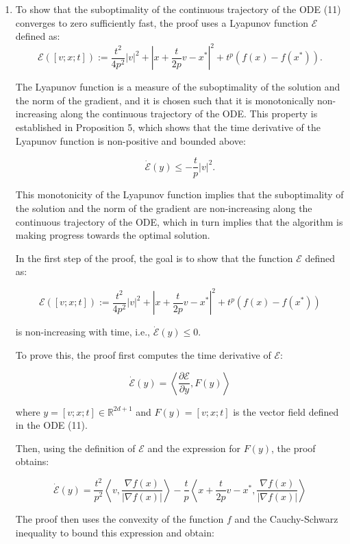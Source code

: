\begin{enumerate}

    \item To show that the suboptimality of the continuous trajectory of the ODE (11) converges to zero sufficiently fast, the proof uses a Lyapunov function $\mathcal{E}$ defined as:
    $$
    \mathcal{E}([v ; x ; t]):=\frac{t^{2}}{4 p^{2}}|v|^{2}+\left|x+\frac{t}{2 p} v-x^*{}\right|^{2}+t^{p}\left(f(x)-f\left(x^{*}\right)\right) .
    $$

    The Lyapunov function is a measure of the suboptimality of the solution and the norm of the gradient, and it is chosen such that it is monotonically non-increasing along the continuous trajectory of the ODE. This property is established in Proposition 5, which shows that the time derivative of the Lyapunov function is non-positive and bounded above:

    $$
    \dot{\mathcal{E}}(y) \leq-\frac{t}{p}|v|^{2} .
    $$

    This monotonicity of the Lyapunov function implies that the suboptimality of the solution and the norm of the gradient are non-increasing along the continuous trajectory of the ODE, which in turn implies that the algorithm is making progress towards the optimal solution.

    In the first step of the proof, the goal is to show that the function $\mathcal{E}$ defined as:

$$
\mathcal{E}([v ; x ; t]) := \frac{t^2}{4p^2} |v|^2 + |x + \frac{t}{2p} v - x^*|^2 + t^p (f(x) - f(x^*))
$$

    is non-increasing with time, i.e., $\dot{\mathcal{E}}(y) \le 0$.

    To prove this, the proof first computes the time derivative of $\mathcal{E}$:

$$
\dot{\mathcal{E}}(y) = \left\langle \frac{\partial \mathcal{E}}{\partial y}, F(y) \right\rangle
$$

    where $y = [v; x; t] \in \mathbb{R}^{2d+1}$ and $F(y) = [v; x; t]$ is the vector field defined in the ODE (11).

    Then, using the definition of $\mathcal{E}$ and the expression for $F(y)$, the proof obtains:

$$
\dot{\mathcal{E}}(y) = \frac{t^2}{p^2} \left\langle v, \frac{\nabla f(x)}{|\nabla f(x)|} \right\rangle - \frac{t}{p} \left\langle x + \frac{t}{2p} v - x^*, \frac{\nabla f(x)}{|\nabla f(x)|} \right\rangle
$$

    The proof then uses the convexity of the function $f$ and the Cauchy-Schwarz inequality to bound this expression and obtain:


\end{enumerate}
